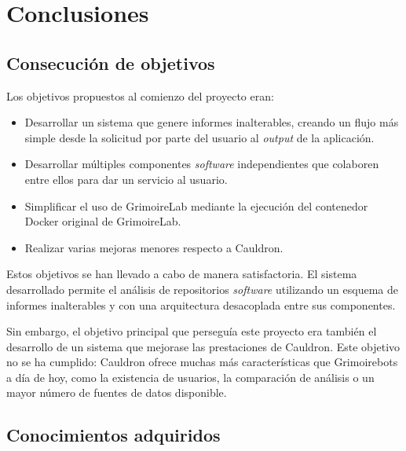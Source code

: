 
\chapter{Conclusiones} %

\label{Chapter5} %


\section{Consecución de objetivos}

Los objetivos propuestos al comienzo del proyecto eran:

\begin{itemize}
    \item Desarrollar un sistema que genere informes inalterables, creando un flujo más simple desde la solicitud por parte del usuario al \emph{output} de la aplicación.
    \item Desarrollar múltiples componentes \emph{software} independientes que colaboren entre ellos para dar un servicio al usuario.
    \item Simplificar el uso de GrimoireLab mediante la ejecución del contenedor Docker original de GrimoireLab.
    \item Realizar varias mejoras menores respecto a Cauldron.
\end{itemize}

Estos objetivos se han llevado a cabo de manera satisfactoria. El sistema desarrollado permite el análisis de repositorios \emph{software} utilizando un esquema de informes inalterables y con una arquitectura desacoplada entre sus componentes.

Sin embargo, el objetivo principal que perseguía este proyecto era también el desarrollo de un sistema que mejorase las prestaciones de Cauldron. Este objetivo no se ha cumplido: Cauldron ofrece muchas más características que Grimoirebots a día de hoy, como la existencia de usuarios, la comparación de análisis o un mayor número de fuentes de datos disponible.


\section{Conocimientos adquiridos}

